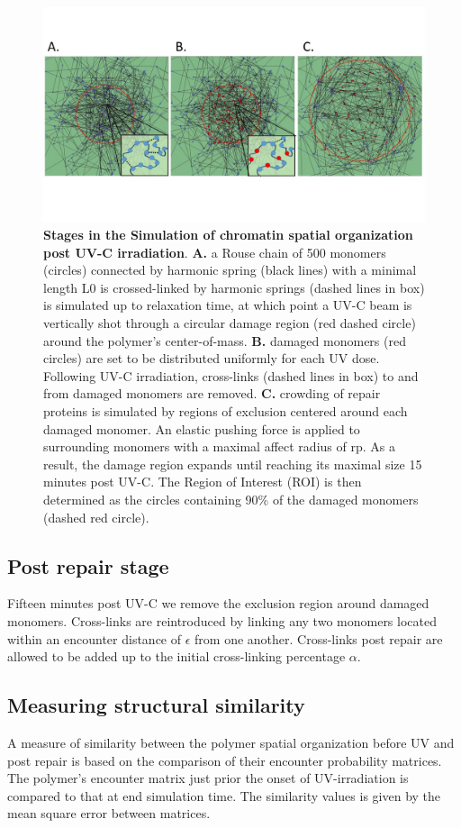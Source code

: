\documentclass[12pt]{article}
\begin{document}
	\begin{figure}[H]
	\includegraphics[width=0.9\linewidth, height=0.35\textheight]{threeStagesOfSimulation}
	\caption{\textbf{Stages in the Simulation of chromatin spatial organization post UV-C irradiation}. \textbf{A.} a Rouse chain of 500 monomers (circles) connected by harmonic spring (black lines) with a minimal length L0 is crossed-linked by harmonic springs (dashed lines in box) is simulated up to relaxation time, at which point a UV-C beam is vertically shot through a circular damage region (red dashed circle) around the polymer’s center-of-mass. \textbf{B.}  damaged monomers (red circles) are set to be distributed uniformly for each UV dose. Following UV-C irradiation, cross-links (dashed lines in box) to and from damaged monomers are removed. \textbf{C.} crowding of repair proteins is simulated by regions of exclusion centered around each damaged monomer. An elastic pushing force is applied to surrounding monomers with a maximal affect radius of rp. As a result, the damage region expands until reaching its maximal size 15 minutes post UV-C. The Region of Interest (ROI) is then determined as the circles containing 90\% of the damaged monomers (dashed red circle).}
	\label{fig:threeStagesOfSimulation}
	\end{figure}
	
	\subsection{Post repair stage}
	Fifteen minutes post UV-C we remove the exclusion region around damaged monomers. Cross-links are reintroduced by linking any two monomers located within an encounter distance of $\epsilon$ from one another. Cross-links post repair are allowed to be added up to the initial cross-linking percentage $\alpha$.
	
	\subsection{Measuring structural similarity}
	A measure of similarity between the polymer spatial organization before UV and post repair is based on the comparison of their encounter probability matrices. The polymer's encounter matrix just prior the onset of UV-irradiation is compared to that at end simulation time. The similarity values is given by the mean square error between matrices. 
	
\end{document}
